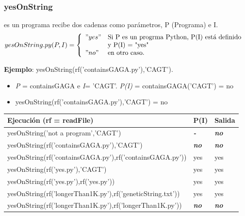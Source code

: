 \documentclass[xcolor=table]{beamer}
\begin{document}
\begin{frame}  \frametitle{yesOnString}  \scriptsize  

es un programa recibe dos cadenas como parámetros,  P (Programa) e I. 
\begin{equation}
     \label{eq:yesOnString.py}
     yesOnString.py (P,I) =  \left\{
	       \begin{array}{ll}
		 "yes"      & \text{Si P es un progrma Python, P(I) está definido } \\
                     &   \text{y P(I) = "yes"} \\
		 "no"       & \text{en otro caso.} \\
	       \end{array}
	     \right.
   \end{equation}

   \textbf{Ejemplo}: yesOnString(rf('containsGAGA.py'),'CAGT').
   \begin{itemize}
       \item \textit{P} = containsGAGA e \textit{I}= 'CAGT'. \textit{P(I)} = containsGAGA('CAGT') = no
       \item yesOnString(rf('containsGAGA.py'),'CAGT') = no
   \end{itemize}
   

    \begin{table}[]
    \begin{tabular}{|l|l|l|}
    \hline
    \rowcolor[HTML]{EFEFEF} 
    {\color[HTML]{000000} \textbf{Ejecución (rf = readFile)}} & {\color[HTML]{000000} \textbf{P(I)}}   & {\color[HTML]{000000} \textbf{Salida}}             \\ \hline\hline
    yesOnString('not a program','CAGT')           & \color[HTML]{FE0000} \textit{\textbf{-}}             & \color[HTML]{FE0000} \textit{\textbf{no}}  \\ \hline\hline
    yesOnString(rf('containsGAGA.py'),'CAGT')     & \color[HTML]{FE0000} \textit{\textbf{no}}            & \color[HTML]{FE0000} \textit{\textbf{no}}  \\ \hline
    yesOnString(rf('containsGAGA.py'),rf('containsGAGA.py')) & yes  & yes \\ \hline\hline
    yesOnString(rf('yes.py'),'CAGT')                & yes           & yes \\ \hline
    yesOnString(rf('yes.py'),rf('yes.py'))         & yes            & yes \\ \hline\hline
    yesOnString(rf('longerThan1K.py'),rf('geneticString.txt')) & yes & yes \\ \hline
    yesOnString(rf('longerThan1K.py'),rf('longerThan1K.py'))  & \color[HTML]{FE0000} \textit{\textbf{no}}  & \color[HTML]{FE0000} \textit{\textbf{no}}  \\ \hline
    \end{tabular}
\end{table}

\end{frame} 
\end{document}
